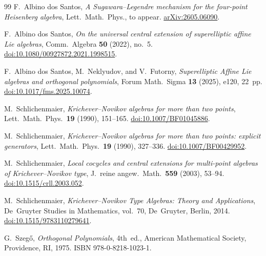 \documentclass[11pt]{amsart}
\theoremstyle{definition}
\theoremstyle{remark}
\begin{document}
\begin{thebibliography}{99}
F.~Albino dos Santos,
\emph{A Sugawara--Legendre mechanism for the four-point Heisenberg algebra},
Lett.\ Math.\ Phys., to appear.
\href{https://arxiv.org/abs/2605.06090}{arXiv:2605.06090}.

F.~Albino dos Santos,
\emph{On the universal central extension of superelliptic affine Lie algebras},
Comm.\ Algebra \textbf{50} (2022), no.~5.
\href{https://doi.org/10.1080/00927872.2021.1998515}{doi:10.1080/00927872.2021.1998515}.

F.~Albino dos Santos, M.~Neklyudov, and V.~Futorny,
\emph{Superelliptic Affine Lie algebras and orthogonal polynomials},
Forum Math.\ Sigma \textbf{13} (2025), e120, 22~pp.
\href{https://doi.org/10.1017/fms.2025.10074}{doi:10.1017/fms.2025.10074}.

M.~Schlichenmaier,
\emph{Krichever--Novikov algebras for more than two points},
Lett.\ Math.\ Phys.\ \textbf{19} (1990), 151--165.
\href{https://doi.org/10.1007/BF01045886}{doi:10.1007/BF01045886}.

M.~Schlichenmaier,
\emph{Krichever--Novikov algebras for more than two points: explicit generators},
Lett.\ Math.\ Phys.\ \textbf{19} (1990), 327--336.
\href{https://doi.org/10.1007/BF00429952}{doi:10.1007/BF00429952}.

M.~Schlichenmaier,
\emph{Local cocycles and central extensions for multi-point algebras of
Krichever--Novikov type},
J.\ reine angew.\ Math.\ \textbf{559} (2003), 53--94.
\href{https://doi.org/10.1515/crll.2003.052}{doi:10.1515/crll.2003.052}.

M.~Schlichenmaier,
\emph{Krichever--Novikov Type Algebras: Theory and Applications},
De~Gruyter Studies in Mathematics, vol.~70, De~Gruyter, Berlin, 2014.
\href{https://doi.org/10.1515/9783110279641}{doi:10.1515/9783110279641}.

G.~Szeg\H{o},
\emph{Orthogonal Polynomials},
4th~ed., American Mathematical Society, Providence, RI, 1975.
ISBN 978-0-8218-1023-1.

\end{thebibliography}
\end{document}
